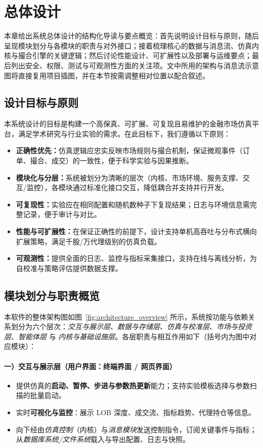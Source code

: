 \documentclass{mancls}
\begin{document}
\section{总体设计}
本章给出系统总体设计的结构化导读与要点概览：首先说明设计目标与原则，随后呈现模块划分与各模块的职责与对外接口；接着梳理核心的数据与消息流、仿真内核与撮合引擎的关键逻辑；然后讨论性能设计、可扩展性以及部署与运维要点；最后列出安全、权限、测试与可观测性方面的关注项。文中所用的架构与消息流示意图将直接复用项目插图，并在本节按需调整相对位置以配合叙述。

\subsection{设计目标与原则}
本系统设计的目标是构建一个高保真、可扩展、可复现且易维护的金融市场仿真平台，满足学术研究与行业实验的需求。在此目标下，我们遵循以下原则：
\begin{itemize}
  \item \textbf{正确性优先：}仿真逻辑应忠实反映市场规则与撮合机制，保证微观事件（订单、撮合、成交）的一致性，便于科学实验与因果推断。
  \item \textbf{模块化与分层：}系统被划分为清晰的层次（内核、市场环境、服务支撑、交互/监控），各模块通过标准化接口交互，降低耦合并支持并行开发。
  \item \textbf{可复现性：}实验应在相同配置和随机数种子下复现结果；日志与环境信息需完整记录，便于审计与对比。
  \item \textbf{性能与可扩展性：}在保证正确性的前提下，设计支持单机高吞吐与分布式横向扩展策略，满足千股/万代理级别的仿真负载。
  \item \textbf{可观测性：}提供全面的日志、监控与指标采集接口，支持在线与离线分析，为自校准与策略评估提供数据支撑。
\end{itemize}

\subsection{模块划分与职责概览}
本软件的整体架构图如图~\ref{fig:architecture_overview} 所示，系统按功能与依赖关系划分为六个层次：\emph{交互与展示层}、\emph{数据与存储层}、\emph{仿真与校准层}、\emph{市场与投资层}、\emph{智能体层} 与 \emph{内核与基础设施层}。各层职责与相互作用如下（括号内为图中对应模块）：

\paragraph{一）交互与展示层（用户界面：终端界面 / 网页界面）}
\begin{itemize}
  \item 提供仿真的\textbf{启动、暂停、步进与参数热更新}能力；支持实验模板选择与参数扫描的批量启动。
  \item 实时\textbf{可视化与监控}：展示 LOB 深度、成交流、指标趋势、代理持仓等信息。
  \item 向下经由\emph{仿真控制}（内核）与\emph{消息模块}发送控制指令，订阅关键事件与指标；从\emph{数据库系统/文件系统}载入与导出配置、日志与快照。
\end{itemize}
\end{document}
